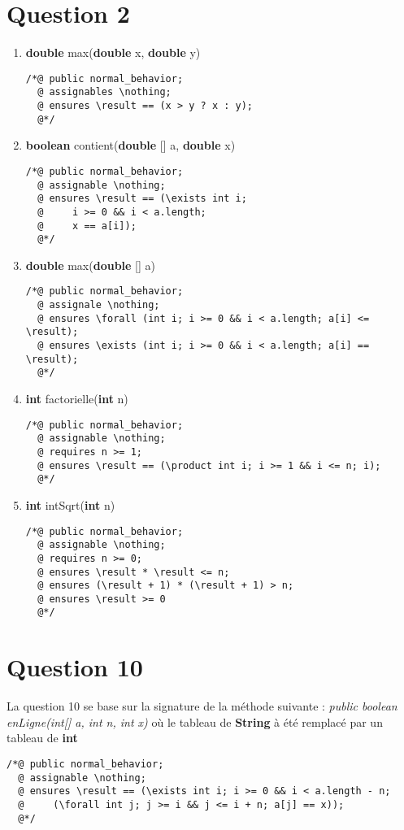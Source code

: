 \documentclass{article}
\begin{document}
\section{Question 2}
\begin{enumerate}
	\item \textbf{double} max(\textbf{double} x, \textbf{double} y)
\begin{lstlisting}
/*@ public normal_behavior;
  @ assignables \nothing;
  @ ensures \result == (x > y ? x : y);
  @*/
\end{lstlisting}
	\item \textbf{boolean} contient(\textbf{double} [] a, \textbf{double} x)
\begin{lstlisting}
/*@ public normal_behavior;
  @ assignable \nothing;
  @ ensures \result == (\exists int i;
  @		i >= 0 && i < a.length;
  @		x == a[i]);
  @*/
\end{lstlisting}
	\item \textbf{double} max(\textbf{double} [] a)
\begin{lstlisting}
/*@ public normal_behavior;
  @ assignale \nothing;
  @ ensures \forall (int i; i >= 0 && i < a.length; a[i] <= \result);
  @ ensures \exists (int i; i >= 0 && i < a.length; a[i] == \result);
  @*/
\end{lstlisting}
	\item \textbf{int} factorielle(\textbf{int} n)
\begin{lstlisting}
/*@ public normal_behavior;
  @ assignable \nothing;
  @ requires n >= 1;
  @ ensures \result == (\product int i; i >= 1 && i <= n; i);
  @*/
\end{lstlisting}
	\item \textbf{int} intSqrt(\textbf{int} n)
\begin{lstlisting}
/*@ public normal_behavior;
  @ assignable \nothing;
  @ requires n >= 0;
  @ ensures \result * \result <= n;
  @ ensures (\result + 1) * (\result + 1) > n;
  @ ensures \result >= 0
  @*/
\end{lstlisting}
\end{enumerate}

\section{Question 10}
La question 10 se base sur la signature de la méthode suivante : \textit{public boolean enLigne(int[] a, int n, int x)} où le tableau de \textbf{String} à été remplacé par un tableau de \textbf{int}
\begin{lstlisting}
/*@ public normal_behavior;
  @ assignable \nothing;
  @ ensures \result == (\exists int i; i >= 0 && i < a.length - n;
  @		(\forall int j; j >= i && j <= i + n; a[j] == x));
  @*/
\end{lstlisting}
\end{document}
